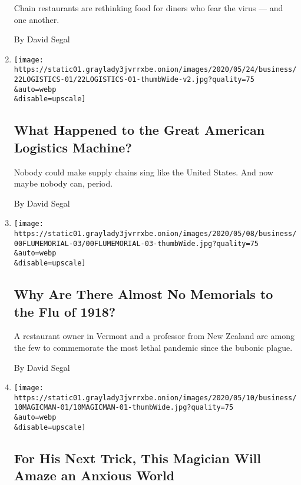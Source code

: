 \begin{enumerate}
  Chain restaurants are rethinking food for diners who fear the virus
  --- and one another.

  By David Segal
\item
  \href{/2020/05/22/business/logistics-supply-chains.html}{}

  \texttt{[image: https://static01.graylady3jvrrxbe.onion/images/2020/05/24/business/22LOGISTICS-01/22LOGISTICS-01-thumbWide-v2.jpg?quality=75\\\&auto=webp\\\&disable=upscale]}

  \hypertarget{what-happened-to-the-great-american-logistics-machine}{%
  \subsection{What Happened to the Great American Logistics
  Machine?}\label{what-happened-to-the-great-american-logistics-machine}}

  Nobody could make supply chains sing like the United States. And now
  maybe nobody can, period.

  By David Segal
\item
  \href{/2020/05/14/business/1918-flu-memorials.html}{}

  \texttt{[image: https://static01.graylady3jvrrxbe.onion/images/2020/05/08/business/00FLUMEMORIAL-03/00FLUMEMORIAL-03-thumbWide.jpg?quality=75\\\&auto=webp\\\&disable=upscale]}

  \hypertarget{why-are-there-almost-no-memorials-to-the-flu-of-1918}{%
  \subsection{Why Are There Almost No Memorials to the Flu of
  1918?}\label{why-are-there-almost-no-memorials-to-the-flu-of-1918}}

  A restaurant owner in Vermont and a professor from New Zealand are
  among the few to commemorate the most lethal pandemic since the
  bubonic plague.

  By David Segal
\item
  \href{/2020/05/05/business/karan-singh-magic.html}{}

  \texttt{[image: https://static01.graylady3jvrrxbe.onion/images/2020/05/10/business/10MAGICMAN-01/10MAGICMAN-01-thumbWide.jpg?quality=75\\\&auto=webp\\\&disable=upscale]}

  \hypertarget{for-his-next-trick-this-magician-will-amaze-an-anxious-world}{%
  \subsection{For His Next Trick, This Magician Will Amaze an Anxious
  World}\label{for-his-next-trick-this-magician-will-amaze-an-anxious-world}}


\end{enumerate}
